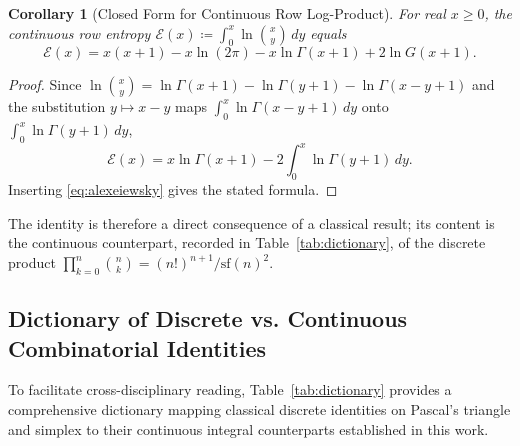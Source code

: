 \documentclass[11pt,a4paper]{article}
\theoremstyle{plain}
\newtheorem{corollary}[theorem]{Corollary}
\theoremstyle{definition}
\theoremstyle{remark}
\numberwithin{equation}{section}
\begin{document}
\begin{corollary}[Closed Form for Continuous Row Log-Product]
\label{cor:row_log_product}
For real $x \ge 0$, the continuous row entropy $\mathcal{E}(x) \coloneqq \int_0^x \ln \binom{x}{y}\,dy$ equals
\begin{equation}
\mathcal{E}(x) = x(x+1) - x\ln(2\pi) - x\ln\Gamma(x+1) + 2\ln G(x+1).
\end{equation}
\end{corollary}
\begin{proof}
Since $\ln\binom{x}{y} = \ln\Gamma(x+1) - \ln\Gamma(y+1) - \ln\Gamma(x-y+1)$ and the substitution $y \mapsto x-y$ maps $\int_0^x \ln\Gamma(x-y+1)\,dy$ onto $\int_0^x \ln\Gamma(y+1)\,dy$,
\begin{equation*}
\mathcal{E}(x) = x\ln\Gamma(x+1) - 2\int_0^x \ln\Gamma(y+1)\,dy .
\end{equation*}
Inserting \eqref{eq:alexeiewsky} gives the stated formula.
\end{proof}

The identity is therefore a direct consequence of a classical result; its content is the continuous counterpart, recorded in Table~\ref{tab:dictionary}, of the discrete product $\prod_{k=0}^n \binom{n}{k} = (n!)^{n+1}/\mathrm{sf}(n)^2$.

\subsection{Dictionary of Discrete vs. Continuous Combinatorial Identities}

To facilitate cross-disciplinary reading, Table~\ref{tab:dictionary} provides a comprehensive dictionary mapping classical discrete identities on Pascal's triangle and simplex to their continuous integral counterparts established in this work.
\end{document}
